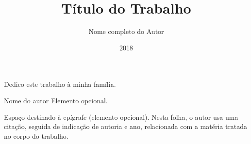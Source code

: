 \documentclass[tsi]{ifbclass/ifbclass}
\title{Título do Trabalho}
\date{2018}
\author{Nome completo do Autor}
\begin{document}
\frontmatter

\frontpage

\presentationpage

\begin{fichacatalografica}
  \FakeFichaCatalografica
\end{fichacatalografica}

\banca

\begin{dedicatory} %
Dedico este trabalho à minha família.
\end{dedicatory}
  
\acknowledgements %


\begin{epigraph}[]{Nome do autor} %
Elemento opcional.

Espaço destinado à epígrafe (elemento opcional). Nesta folha, o autor usa uma citação, seguida de indicação de autoria e ano, relacionada com a matéria tratada no corpo do trabalho.
\end{epigraph}

\resumo
{\parindent0pt
  
}
  
\abstract
{\parindent0pt
  
}

\listoffigures

\lstlistoflistings

\listoftables

\listofacronyms


\tableofcontents

\mainmatter








\begin{references}
  
\end{references}


\theappendix

\end{document}
